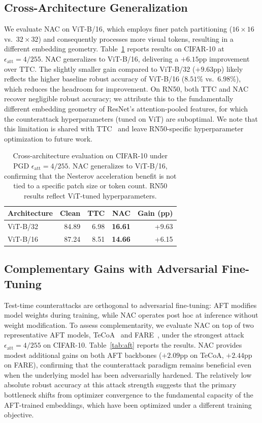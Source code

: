 \documentclass[pdflatex,sn-basic,Numbered]{sn-jnl}
\theoremstyle{thmstyleone}
\theoremstyle{thmstyletwo}
\theoremstyle{thmstylethree}
\begin{document}
\subsection{Cross-Architecture Generalization}

We evaluate NAC on ViT-B/16, which employs finer patch partitioning ($16\times16$ vs.\ $32\times32$) and consequently processes more visual tokens, resulting in a different embedding geometry. Table~\ref{tab:cross} reports results on CIFAR-10 at $\epsilon_{\text{att}}=4/255$. NAC generalizes to ViT-B/16, delivering a $+6.15$pp improvement over TTC. The slightly smaller gain compared to ViT-B/32 ($+9.63$pp) likely reflects the higher baseline robust accuracy of ViT-B/16 ($8.51\%$ vs.\ $6.98\%$), which reduces the headroom for improvement. On RN50, both TTC and NAC recover negligible robust accuracy; we attribute this to the fundamentally different embedding geometry of ResNet's attention-pooled features, for which the counterattack hyperparameters (tuned on ViT) are suboptimal. We note that this limitation is shared with TTC~\cite{xing2025clip} and leave RN50-specific hyperparameter optimization to future work.

\begin{table}[ht]\centering\small
\caption{Cross-architecture evaluation on CIFAR-10 under PGD $\epsilon_{\text{att}}=4/255$. NAC generalizes to ViT-B/16, confirming that the Nesterov acceleration benefit is not tied to a specific patch size or token count. RN50 results reflect ViT-tuned hyperparameters.}\label{tab:cross}
\begin{tabular}{@{}lrrrr@{}}
\toprule Architecture & Clean & TTC & NAC & Gain (pp) \\
\midrule ViT-B/32 & 84.89 & 6.98 & \textbf{16.61} & +9.63 \\
ViT-B/16 & 87.24 & 8.51 & \textbf{14.66} & +6.15 \\
\bottomrule
\end{tabular}
\end{table}

\subsection{Complementary Gains with Adversarial Fine-Tuning}

Test-time counterattacks are orthogonal to adversarial fine-tuning: AFT modifies model weights during training, while NAC operates post hoc at inference without weight modification. To assess complementarity, we evaluate NAC on top of two representative AFT models, TeCoA~\cite{mao2023understanding} and FARE~\cite{schlarmann2024robust}, under the strongest attack $\epsilon_{\text{att}}=4/255$ on CIFAR-10. Table~\ref{tab:aft} reports the results. NAC provides modest additional gains on both AFT backbones ($+2.09$pp on TeCoA, $+2.44$pp on FARE), confirming that the counterattack paradigm remains beneficial even when the underlying model has been adversarially hardened. The relatively low absolute robust accuracy at this attack strength suggests that the primary bottleneck shifts from optimizer convergence to the fundamental capacity of the AFT-trained embeddings, which have been optimized under a different training objective.
\end{document}
